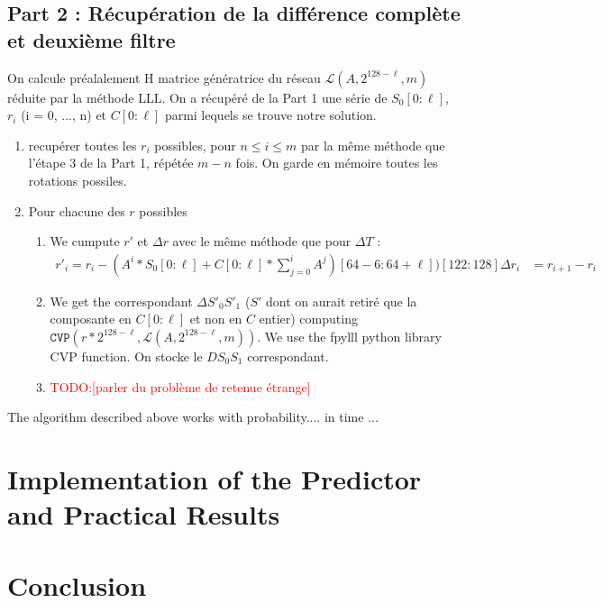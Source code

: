 \documentclass[preprint]{iacrtrans}
\newcommand{\todo}[1]{\textcolor{red}{TODO:[#1]}}
\begin{document}
\subsection{Part 2 : Récupération de la différence complète et deuxième filtre}
On calcule préalalement H matrice génératrice du réseau $\mathcal{L}(A,2^{128 - \ell},m)$ réduite par la méthode LLL.
On a récupéré de la Part 1 une série de $S_0[0 : \ell]$, $r_i$ (i = 0, ..., n) et $C[0 : \ell]$ parmi lequels se trouve notre solution.
\begin{enumerate}
  \item recupérer toutes les $r_i$ possibles, pour $n \leq i \leq m$  par la même méthode que l'étape 3 de la Part 1, répétée $m-n$ fois. On garde en mémoire toutes les rotations possiles.
  \item Pour chacune des $r$ possibles
  \begin{enumerate}
    \item We cumpute $r'$ et $\Delta r$ avec le même méthode que pour $\Delta T$ : 
    \begin{align}
      r'_i = r_i - (A^i*S_0[0 : \ell] + C[0 : \ell] * \sum_{j = 0}^i A^j)[64 - 6 : 64 + \ell])[122 : 128]
      \Delta r_i &= r_{i+1} - r_i
    \end{align}

    \item We get the correspondant $\Delta S'_0S'_1$ ($S'$ dont on aurait retiré que la composante en $C[0 : \ell]$ et non en $C$ entier) computing $\texttt{CVP}(r * 2^{128 - \ell}, \mathcal{L}(A,2^{128 - \ell},m))$. We use the fpylll python library CVP function. On stocke le $DS_0S_1$ correspondant.

    \item \todo{parler du problème de retenue étrange}
    
  \end{enumerate}
\end{enumerate}

\begin{theorem}
  The algorithm described above works with probability.... in time ...
\end{theorem}

\section{Implementation of the Predictor and Practical Results}

\section{Conclusion}




\end{document}

